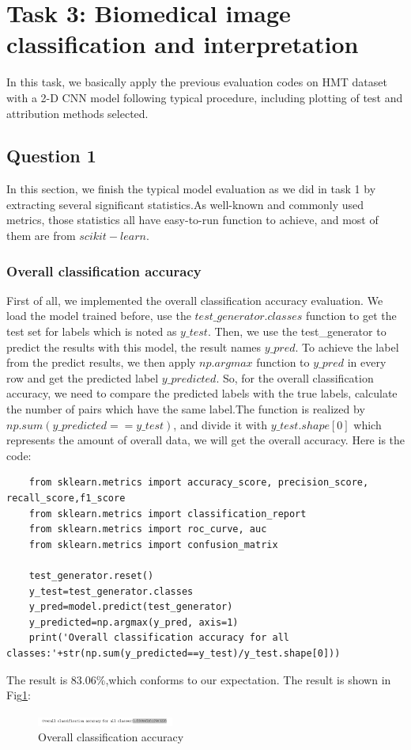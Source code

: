 \documentclass[conference]{IEEEtran}
\begin{document}
\section{Task 3: Biomedical image classification and interpretation}
In this task, we basically apply the previous evaluation codes on HMT dataset with a 2-D CNN model following typical procedure, including plotting of test and attribution methods selected.
\subsection{Question 1}
In this section, we finish the typical model evaluation as we did in task 1 by extracting several significant statistics.As well-known and commonly used metrics, those statistics all have easy-to-run
function to achieve, and most of them are from $scikit-learn$.
\subsubsection{Overall classification accuracy}
First of all, we implemented the overall classification accuracy evaluation. We load the model trained before, use the $test\_generator.classes$ function to get the test set for labels which is noted as $y\_test$.
Then, we use the test\_generator to predict the results with this model, the result names $y\_pred$. To achieve the label from the predict results, we then apply $np.argmax$ function to $y\_pred$ in every row and get the predicted label $y\_predicted$. 
So, for the overall classification accuracy, we need to compare the predicted labels with the true labels, calculate the number of pairs which have the same label.The function is realized by $np.sum(y\_predicted==y\_test)$, and divide it with $y\_test.shape[0]$ which represents the amount of overall data, we will get the overall accuracy.
Here is the code:
\begin{lstlisting}
    from sklearn.metrics import accuracy_score, precision_score, recall_score,f1_score
    from sklearn.metrics import classification_report
    from sklearn.metrics import roc_curve, auc
    from sklearn.metrics import confusion_matrix

    test_generator.reset()
    y_test=test_generator.classes
    y_pred=model.predict(test_generator)
    y_predicted=np.argmax(y_pred, axis=1)
    print('Overall classification accuracy for all classes:'+str(np.sum(y_predicted==y_test)/y_test.shape[0]))
\end{lstlisting}
The result is 83.06\%,which conforms to our expectation. The result is shown in Fig\ref{Fig.t3q1}:
\begin{figure}[h] 
    \centering
    \includegraphics[width=0.4\textwidth]{./graphs/T3Q1a.png}
    \caption{Overall classification accuracy}
    \label{Fig.t3q1}
\end{figure}
\end{document}
